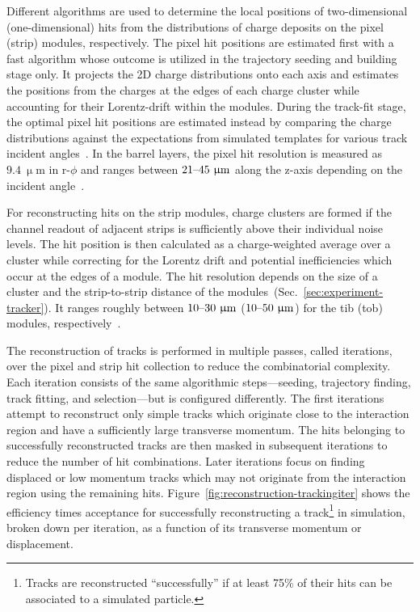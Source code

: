 Different algorithms are used to determine the local positions of two-dimensional (one-dimensional) hits from the distributions of charge deposits on the pixel (strip) modules, respectively. The pixel hit positions are estimated first with a fast algorithm whose outcome is utilized in the trajectory seeding and building stage only. It projects the 2D charge distributions onto each axis and estimates the positions from the charges at the edges of each charge cluster while accounting for their Lorentz-drift within the modules. During the track-fit stage, the optimal pixel hit positions are estimated instead by comparing the charge distributions against the expectations from simulated templates for various track incident angles~\cite{Swartz:2007zz}. In the barrel layers, the pixel hit resolution is measured as $9.4~\upmu\mathrm{m}$ in $\mathrm{r}\mbox{-}\phi$ and ranges between $21\text{--}45~\upmu\mathrm{m}$ along the z-axis depending on the incident angle~\cite{Chatrchyan:2014fea}. 

For reconstructing hits on the strip modules, charge clusters are formed if the channel readout of adjacent strips is sufficiently above their individual noise levels. The hit position is then calculated as a charge-weighted average over a cluster while correcting for the Lorentz drift and potential inefficiencies which occur at the edges of a module. The hit resolution depends on the size of a cluster and the strip-to-strip distance of the modules~(Sec.~\ref{sec:experiment-tracker}). It ranges roughly between $10\text{--}30~\upmu\mathrm{m}$ ($10\text{--}50~\upmu\mathrm{m}$) for the \gls{tib} (\gls{tob}) modules, respectively~\cite{Chatrchyan:2014fea}.

The reconstruction of tracks is performed in multiple passes, called iterations, over the pixel and strip hit collection to reduce the combinatorial complexity. Each iteration consists of the same algorithmic steps---seeding, trajectory finding, track fitting, and selection---but is configured differently. The first iterations attempt to reconstruct only simple tracks which originate close to the interaction region and have a sufficiently large transverse momentum. The hits belonging to successfully reconstructed tracks are then masked in subsequent iterations to reduce the number of hit combinations. Later iterations focus on finding displaced or low momentum tracks which may not originate from the interaction region using the remaining hits. Figure~\ref{fig:reconstruction-trackingiter} shows the efficiency times acceptance for successfully reconstructing a track\footnote{Tracks are reconstructed ``successfully'' if at least 75\% of their hits can be associated to a simulated particle.} in simulation, broken down per iteration, as a function of its transverse momentum or displacement.

